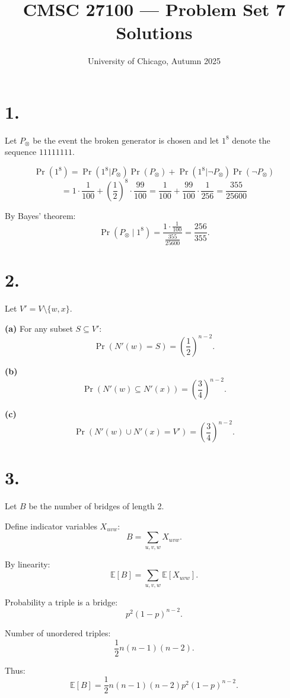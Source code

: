 \documentclass[11pt]{article}
\title{CMSC 27100 --- Problem Set 7 Solutions}
\date{University of Chicago, Autumn 2025}
\begin{document}
\maketitle

\section*{1.}
Let $P_\otimes$ be the event the broken generator is chosen and let $1^8$ denote the sequence $11111111$.

\[
\Pr(1^8) = \Pr(1^8|P_\otimes)\Pr(P_\otimes) + \Pr(1^8|\neg P_\otimes)\Pr(\neg P_\otimes)
\]
\[
= 1 \cdot \frac{1}{100} + \left(\frac{1}{2}\right)^8 \cdot \frac{99}{100}
= \frac{1}{100} + \frac{99}{100}\cdot \frac{1}{256}
= \frac{355}{25600}
\]

By Bayes' theorem:
\[
\Pr(P_\otimes \mid 1^8) = \frac{1 \cdot \frac{1}{100}}{\frac{355}{25600}} = \frac{256}{355}.
\]

\section*{2.}
Let $V' = V \setminus \{w,x\}$.

\textbf{(a)} For any subset $S \subseteq V'$:
\[
\Pr(N'(w)=S) = \left(\frac{1}{2}\right)^{n-2}.
\]

\textbf{(b)} 
\[
\Pr(N'(w) \subseteq N'(x)) = \left(\frac{3}{4}\right)^{n-2}.
\]

\textbf{(c)}
\[
\Pr(N'(w) \cup N'(x) = V') = \left(\frac{3}{4}\right)^{n-2}.
\]

\section*{3.}
Let $B$ be the number of bridges of length 2.

Define indicator variables $X_{uvw}$:
\[
B = \sum_{u,v,w} X_{uvw}.
\]

By linearity:
\[
\mathbb{E}[B] = \sum_{u,v,w} \mathbb{E}[X_{uvw}].
\]

Probability a triple is a bridge:
\[
p^2 (1-p)^{n-2}.
\]

Number of unordered triples:
\[
\frac{1}{2} n(n-1)(n-2).
\]

Thus:
\[
\mathbb{E}[B] = \frac{1}{2} n(n-1)(n-2) p^2 (1-p)^{n-2}.
\]
\end{document}
